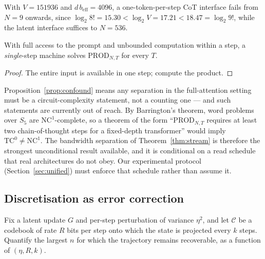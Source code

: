 \begin{corollary}
\label{cor:instantiate}
With $V = 151936$ and $d\,b_{\mathrm{eff}} = 4096$, a one-token-per-step CoT
interface fails from $N = 9$ onwards, since
$\log_2 8! = 15.30 < \log_2 V = 17.21 < 18.47 = \log_2 9!$, while the latent
interface suffices to $N = 536$.
\end{corollary}

\begin{proposition}
\label{prop:confound}
With full access to the prompt and unbounded computation within a step, a
\emph{single}-step machine solves $\mathrm{PROD}_{N,T}$ for every $T$.
\end{proposition}

\begin{proof}
The entire input is available in one step; compute the product.
\end{proof}

\begin{remark}[A barrier]
\label{rem:barrington}
Proposition~\ref{prop:confound} means any separation in the full-attention
setting must be a circuit-complexity statement, not a counting one --- and such
statements are currently out of reach. By Barrington's theorem, word problems
over $S_5$ are $\mathrm{NC}^1$-complete, so a theorem of the form
``$\mathrm{PROD}_{N,T}$ requires at least two chain-of-thought steps for a
fixed-depth transformer'' would imply $\mathrm{TC}^0 \ne \mathrm{NC}^1$. The
bandwidth separation of Theorem~\ref{thm:stream} is therefore the strongest
unconditional result available, and it is conditional on a read schedule that
real architectures do not obey. Our experimental protocol
(Section~\ref{sec:unified}) must enforce that schedule rather than assume it.
\end{remark}

\subsection{Discretisation as error correction}

\begin{openproblem}
\label{op:drift}
Fix a latent update $G$ and per-step perturbation of variance $\eta^2$, and let
$\mathcal{C}$ be a codebook of rate $R$ bits per step onto which the state is
projected every $k$ steps. Quantify the largest $n$ for which the trajectory
remains recoverable, as a function of $(\eta, R, k)$.
\end{openproblem}


